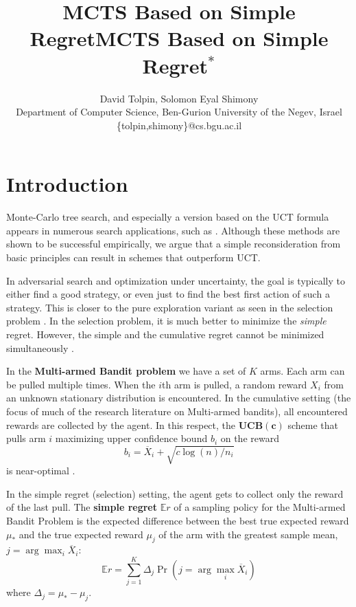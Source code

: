 \documentclass[letterpaper]{article}
\title{MCTS Based on Simple Regret}
\author {David Tolpin, Solomon Eyal Shimony \\
Department of Computer Science, Ben-Gurion University of the Negev, Israel \\
\{tolpin,shimony\}@cs.bgu.ac.il}
\title{MCTS Based on Simple Regret$^*$}
\newcommand {\IE} {\ensuremath {\mathbb{E}}}
\begin{document}
\maketitle
\insert{}

 \section{Introduction}

Monte-Carlo tree search, and especially a version based on the UCT
formula \cite{Kocsis.uct} appears in numerous search applications,
such as \cite{GellyWang.mogo,Eyerich.ctp}. Although these methods are
shown to be successful empirically, we argue that a simple
reconsideration from basic principles can result in schemes that
outperform UCT.

In adversarial search and optimization under uncertainty, the goal is
typically to either find a good strategy, or even just to
find the best first action of such a strategy. This is closer to the pure
exploration variant \cite{Bubeck.pure} as seen in the selection problem
\cite{TolpinShimony.blinkered}. In the selection problem,
it is much better to minimize the \emph{simple} regret.  However, the
simple and the cumulative regret cannot be minimized
simultaneously \cite{Bubeck.pure}.

In the {\bf Multi-armed Bandit problem} \cite{Vermorel.bandits} we have a set
of $K$ arms. Each arm can
be pulled multiple times. When the $i$th arm
is pulled, a random reward $X_i$ from an unknown stationary
distribution is encountered.
In the cumulative setting (the focus of much of the research literature on Multi-armed bandits),
all encountered rewards are collected by the agent. 
In this respect, the $\mathbf{UCB(c)}$ scheme that pulls arm $i$ maximizing
upper confidence bound $b_i$ on the reward 
\begin{equation}
b_i=\overline X_i+\sqrt {{c \log (n)} / {n_i}}
\label{eqn:ucb}
\end{equation}
is near-optimal \cite{Auer.ucb}.

In the simple regret (selection) setting, the agent gets to collect
only the reward of the last pull. The \textbf{simple regret} $\IE r$
of a sampling policy for the Multi-armed Bandit Problem is the
expected difference between the best true expected reward $\mu_*$ and
the true expected reward $\mu_j$ of the arm with the greatest sample
mean, $j =\arg \max_i\overline X_i$:
\begin{equation}
\IE r=\sum_{j=1}^K\Delta_j\Pr(j=\arg\max_i\overline X_i)
\label{eqn:simple-regret}
\end{equation}
where $\Delta_j=\mu_*-\mu_j$.
\end{document}

